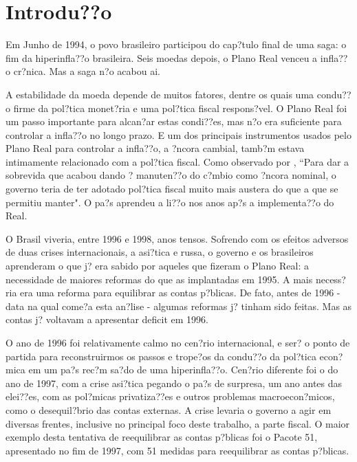 \documentclass{article}
\begin{document}
\newpage

\setcounter{page}{1}
\tableofcontents

\newpage

\section{Introdu??o}

Em Junho de 1994, o povo brasileiro participou do cap?tulo final de uma saga: o fim da hiperinfla??o brasileira. Seis moedas depois, o Plano Real venceu a infla??o cr?nica. Mas a saga n?o acabou ai.

A estabilidade da moeda depende de muitos fatores, dentre os quais uma condu??o firme da pol?tica monet?ria e uma pol?tica fiscal respons?vel. O Plano Real foi um passo importante para alcan?ar estas condi??es, mas n?o era suficiente para controlar a infla??o no longo prazo. E um dos principais instrumentos usados pelo Plano Real para controlar a infla??o, a ?ncora cambial, tamb?m estava intimamente relacionado com a pol?tica fiscal. Como observado por \citet[p. 332]{Werneck2014}, ``Para dar a sobrevida que acabou dando ? manuten??o do c?mbio como ?ncora nominal, o governo teria de ter adotado pol?tica fiscal muito mais austera do que a que se permitiu manter". O pa?s aprendeu a li??o nos anos ap?s a implementa??o do Real. %

O Brasil viveria, entre 1996 e 1998, anos tensos. Sofrendo com os efeitos adversos de duas crises internacionais, a asi?tica e russa, o governo e os brasileiros aprenderam o que j? era sabido por aqueles que fizeram o Plano Real: a necessidade de maiores reformas do que as implantadas em 1995. A mais necess?ria era uma reforma para equilibrar as contas p?blicas. De fato, antes de 1996 - data na qual come?a esta an?lise - algumas reformas j? tinham sido feitas. Mas as contas j? voltavam a apresentar deficit em 1996.

O ano de 1996 foi relativamente calmo no cen?rio internacional, e ser? o ponto de partida para reconstruirmos os passos e trope?os da condu??o da pol?tica econ?mica em um pa?s rec?m sa?do de uma hiperinfla??o. Cen?rio diferente foi o do ano de 1997, com a crise asi?tica pegando o pa?s de surpresa, um ano antes das elei??es, com as pol?micas privatiza??es e outros problemas macroecon?micos, como o desequil?brio das contas externas. A crise levaria o governo a agir em diversas frentes, inclusive no principal foco deste trabalho, a parte fiscal. O maior exemplo desta tentativa de reequilibrar as contas p?blicas foi o Pacote 51, apresentado no fim de 1997, com 51 medidas para reequilibrar as contas p?blicas.
\end{document}
